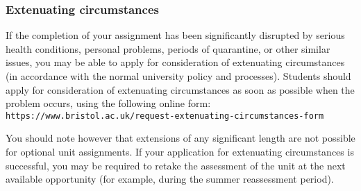 \documentclass[12pt]{article}
\begin{document}
 \subsubsection*{Extenuating circumstances}

If the completion of your assignment has been significantly disrupted
by serious health conditions, personal problems, periods of
quarantine, or other similar issues, you may be able to apply for
consideration of extenuating circumstances (in accordance with the
normal university policy and processes). Students should apply for
consideration of extenuating circumstances as soon as possible when
the problem occurs, using the following online form:
\texttt{https://www.bristol.ac.uk/request-extenuating-circumstances-form}

You should note however that extensions of any significant length are
not possible for optional unit assignments. If your application for
extenuating circumstances is successful, you may be required to retake
the assessment of the unit at the next available opportunity (for
example, during the summer reassessment period).
\end{document}
